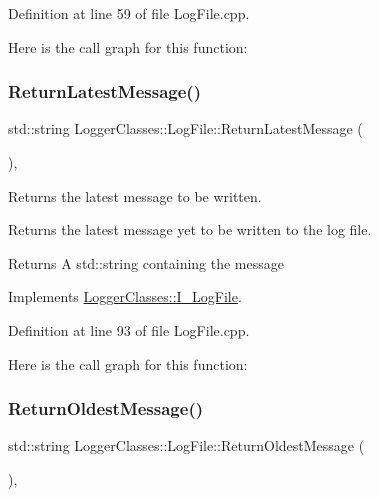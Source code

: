 Definition at line 59 of file Log\+File.\+cpp.

Here is the call graph for this function\+:
\mbox{\label{classLoggerClasses_1_1LogFile_a94dc0e9ef181ba4875f8ca3028009c67}} 
\subsubsection{\texorpdfstring{ReturnLatestMessage()}{ReturnLatestMessage()}}
{\footnotesize\ttfamily std\+::string Logger\+Classes\+::\+Log\+File\+::\+Return\+Latest\+Message (\begin{DoxyParamCaption}{ }\end{DoxyParamCaption})\hspace{0.3cm}{\ttfamily [override]}, {\ttfamily [virtual]}}



Returns the latest message to be written. 

Returns the latest message yet to be written to the log file.

\begin{DoxyReturn}{Returns}
A std\+::string containing the message 
\end{DoxyReturn}


Implements \mbox{\hyperlink{classLoggerClasses_1_1I__LogFile_a45f85ac4d59df0b7a96f0282cff1ba87}{Logger\+Classes\+::\+I\+\_\+\+Log\+File}}.



Definition at line 93 of file Log\+File.\+cpp.

Here is the call graph for this function\+:
\mbox{\label{classLoggerClasses_1_1LogFile_a85d4c992c40d275a33901980424c341b}} 
\subsubsection{\texorpdfstring{ReturnOldestMessage()}{ReturnOldestMessage()}}
{\footnotesize\ttfamily std\+::string Logger\+Classes\+::\+Log\+File\+::\+Return\+Oldest\+Message (\begin{DoxyParamCaption}{ }\end{DoxyParamCaption})\hspace{0.3cm}{\ttfamily [override]}, {\ttfamily [virtual]}}



